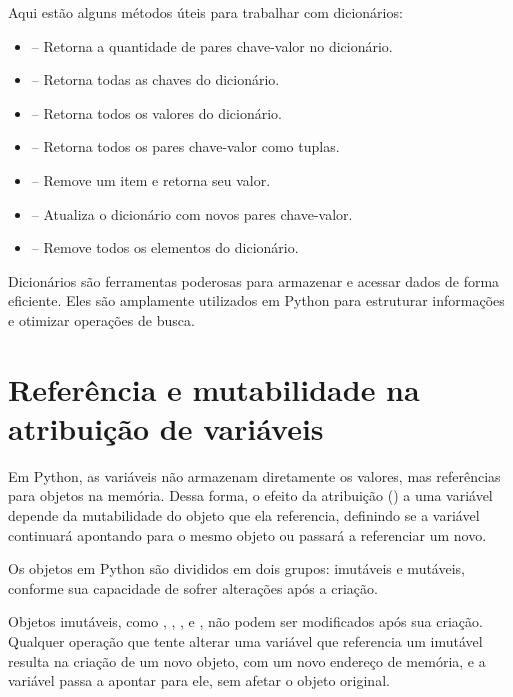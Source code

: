 Aqui estão alguns métodos úteis para trabalhar com dicionários:
\begin{itemize}
\item {} -- Retorna a quantidade de pares chave-valor no dicionário.
\item {} -- Retorna todas as chaves do dicionário.
\item {} -- Retorna todos os valores do dicionário.
\item {} -- Retorna todos os pares chave-valor como tuplas.
\item {} -- Remove um item e retorna seu valor.
\item {} -- Atualiza o dicionário com novos pares chave-valor.
\item {} -- Remove todos os elementos do dicionário.
\end{itemize}

Dicionários são ferramentas poderosas para armazenar e acessar dados de forma eficiente.
Eles são amplamente utilizados em Python para estruturar informações e otimizar operações de busca.





\section{Referência e mutabilidade na atribuição de variáveis}

Em Python, as variáveis não armazenam diretamente os valores, mas referências para objetos na memória.
Dessa forma, o efeito da atribuição (\inlcode{=}) a uma variável depende da mutabilidade do objeto que ela
referencia, definindo se a variável continuará apontando para o mesmo objeto ou passará a referenciar um novo.

Os objetos em Python são divididos em dois grupos: imutáveis e mutáveis, conforme sua capacidade de sofrer alterações
após a criação.

Objetos imutáveis, como , , ,  e , não podem ser
modificados após sua criação.
Qualquer operação que tente alterar uma variável que referencia um imutável resulta na criação de um novo objeto,
com um novo endereço de memória, e a variável passa a apontar para ele, sem afetar o objeto original.


